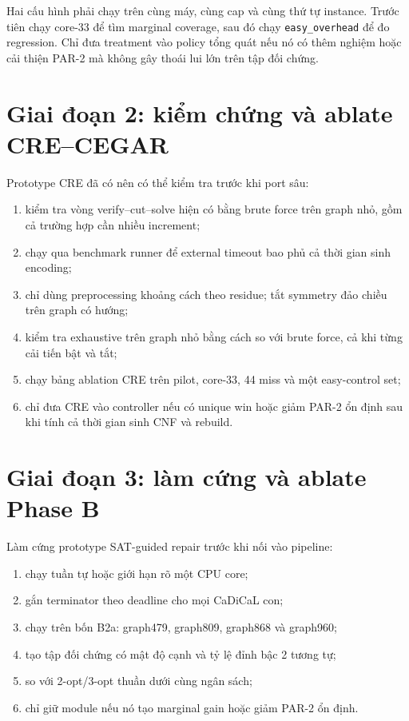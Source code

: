 \documentclass[11pt,a4paper,oneside]{scrreprt}
\newcommand{\code}[1]{\texttt{#1}}
\begin{document}
Hai cấu hình phải chạy trên cùng máy, cùng cap và cùng thứ tự instance. Trước tiên chạy core-33 để tìm marginal coverage, sau đó chạy \code{easy\_overhead} để đo regression. Chỉ đưa treatment vào policy tổng quát nếu nó có thêm nghiệm hoặc cải thiện PAR-2 mà không gây thoái lui lớn trên tập đối chứng.

\section{Giai đoạn 2: kiểm chứng và ablate CRE--CEGAR}

Prototype CRE đã có nên có thể kiểm tra trước khi port sâu:

\begin{enumerate}
  \item kiểm tra vòng verify--cut--solve hiện có bằng brute force trên graph nhỏ, gồm cả trường hợp cần nhiều increment;
  \item chạy qua benchmark runner để external timeout bao phủ cả thời gian sinh encoding;
  \item chỉ dùng preprocessing khoảng cách theo residue; tắt symmetry đảo chiều trên graph có hướng;
  \item kiểm tra exhaustive trên graph nhỏ bằng cách so với brute force, cả khi từng cải tiến bật và tắt;
  \item chạy bảng ablation CRE trên pilot, core-33, 44 miss và một easy-control set;
  \item chỉ đưa CRE vào controller nếu có unique win hoặc giảm PAR-2 ổn định sau khi tính cả thời gian sinh CNF và rebuild.
\end{enumerate}

\section{Giai đoạn 3: làm cứng và ablate Phase B}

Làm cứng prototype SAT-guided repair trước khi nối vào pipeline:

\begin{enumerate}
  \item chạy tuần tự hoặc giới hạn rõ một CPU core;
  \item gắn terminator theo deadline cho mọi CaDiCaL con;
  \item chạy trên bốn B2a: graph479, graph809, graph868 và graph960;
  \item tạo tập đối chứng có mật độ cạnh và tỷ lệ đỉnh bậc 2 tương tự;
  \item so với 2-opt/3-opt thuần dưới cùng ngân sách;
  \item chỉ giữ module nếu nó tạo marginal gain hoặc giảm PAR-2 ổn định.
\end{enumerate}
\end{document}
